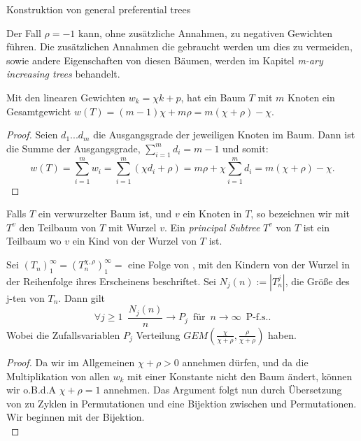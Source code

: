\begin{section}{Konstruktion von general preferential trees}
\begin{Bemerkung}
    Der Fall $\rho = -1$ kann, ohne zusätzliche Annahmen, zu negativen Gewichten führen. Die zusätzlichen Annahmen die gebraucht werden um dies zu vermeiden, sowie andere Eigenschaften von diesen Bäumen, werden im Kapitel \textit{m-ary increasing trees} behandelt.
\end{Bemerkung}
\begin{theorem}
\cite[Lemma 3.1]{janson2019random}
\label{Gewichte Satz}
   Mit den linearen Gewichten $w_k = \chi k + p $, hat ein Baum $T$ mit $m$ Knoten ein Gesamtgewicht $w(T) = (m-1)\chi + m\rho = m(\chi + \rho) - \chi$.
\end{theorem}
\begin{proof}
    Seien $d_1...d_m$ die Ausgangsgrade der jeweiligen Knoten im Baum. Dann ist die Summe der Ausgangsgrade, $\sum_{i=1}^{m}d_i = m-1$ und somit:
    \[
     w(T) = \sum_{i=1}^{m}w_i = \sum_{i=1}^{m} (\chi d_i + \rho) = m \rho + \chi \sum_{i = 1}^{m} d_i = m(\chi + \rho) - \chi.
    \]
\end{proof}
\begin{Definition}
    Falls $T$ ein verwurzelter Baum ist, und $v$ ein Knoten in $T$, so bezeichnen wir mit $T^v$ den Teilbaum von $T$ mit Wurzel $v$. Ein \textit{principal Subtree} $T^v$ von $T$ ist ein Teilbaum wo $v$ ein Kind von der Wurzel von $T$ ist.
\end{Definition}
\begin{theorem} \cite[Theorem 3.2]{janson2019random}
    \label{linpreft Grenzwert}
    Sei $(T_n)_1^\infty =(T_n^{\chi,\rho})_1^\infty = $ eine Folge von \linpreft, mit den Kindern von der Wurzel in der Reihenfolge ihres Erscheinens beschriftet. Sei $N_j(n) := |T^j_n|$, die Größe des j-ten \PsubT von $T_n$. Dann gilt 
    \[ 
        \forall j \geq 1  \hspace{6pt} \frac{N_j(n)}{n}  \rightarrow P_j \hspace{6pt} \text{für} \hspace{6pt} n \rightarrow \infty \hspace{6pt} \text{P-f.s.}.
  \]
Wobei die Zufallsvariablen  $P_j$ Verteilung $GEM(\frac{\chi}{\chi+\rho},{\frac{\rho}{\chi+\rho}})$ haben.  
\end{theorem}
\begin{proof}
    Da wir im Allgemeinen $\chi + \rho > 0 $ annehmen dürfen, und da die Multiplikation von allen $w_k$ mit einer Konstante nicht den Baum ändert, können wir o.B.d.A   $\chi + \rho = 1 $ annehmen. Das Argument folgt nun durch Übersetzung von \PsubT zu Zyklen in Permutationen und eine Bijektion zwischen \linpreft und Permutationen. Wir beginnen mit der Bijektion. \\

\end{proof}
\end{section}
